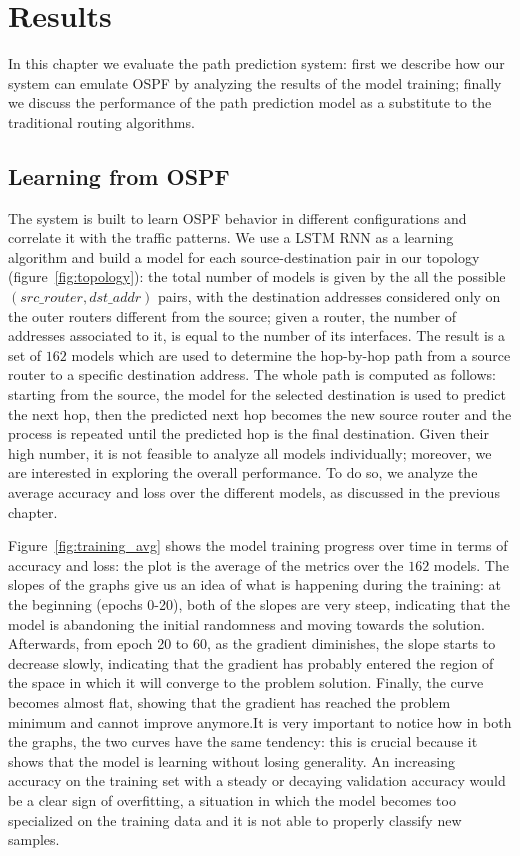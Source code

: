 \chapter{Results}\label{ch:results}

In this chapter we evaluate the path prediction system: first we describe how our system can emulate OSPF by analyzing the results of the model training; finally we discuss the performance of the path prediction model as a substitute to the traditional routing algorithms.

\section{Learning from OSPF}
The system is built to learn OSPF behavior in different configurations and correlate it with the traffic patterns. We use a LSTM RNN as a learning algorithm and build a model for each source-destination pair in our topology (figure~\ref{fig:topology}): the total number of models is given by the all the possible $(src\_router, dst\_addr)$ pairs, with the destination addresses considered only on the outer routers different from the source; given a router, the number of addresses associated to it, is equal to the number of its interfaces. The result is a set of $162$ models which are used to determine the hop-by-hop path from a source router to a specific destination address. The whole path is computed as follows: starting from the source, the model for the selected destination is used to predict the next hop, then the predicted next hop becomes the new source router and the process is repeated until the predicted hop is the final destination. Given their high number, it is not feasible to analyze all models individually; moreover, we are interested in exploring the overall performance. To do so, we analyze the average accuracy and loss over the different models, as discussed in the previous chapter.

Figure~\ref{fig:training_avg} shows the model training progress over time in terms of accuracy and loss: the plot is the average of the metrics over the $162$ models. The slopes of the graphs give us an idea of what is happening during the training: at the beginning (epochs 0-20), both of the slopes are very steep, indicating that the model is abandoning the initial randomness and moving towards the solution. Afterwards, from epoch 20 to 60, as the gradient diminishes, the slope starts to decrease slowly, indicating that the gradient has probably entered the region of the space in which it will converge to the problem solution. Finally, the curve becomes almost flat, showing that the gradient has reached the problem minimum and cannot improve anymore.It is very important to notice how in both the graphs, the two curves have the same tendency: this is crucial because it shows that the model is learning without losing generality. An increasing accuracy on the training set with a steady or decaying validation accuracy would be a clear sign of overfitting, a situation in which the model becomes too specialized on the training data and it is not able to properly classify new samples.

